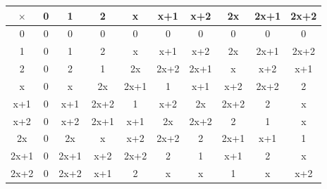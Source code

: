 \documentclass[12pt]{article}
\begin{document}
\begin{flushleft}
    \begin{table}[h]
        \centering
        \renewcommand{\arraystretch}{1.2}
    \begin{tabular}{c|c|c|c|c|c|c|c|c|c}
    $\times$ & 0 & 1 & 2 & x & x+1 & x+2 & 2x & 2x+1 & 2x+2 \\
        \hline
        0 & 0 & 0 & 0 & 0 & 0 & 0 & 0 & 0 & 0 \\
        1 & 0 & 1 & 2 & x & x+1 & x+2 & 2x & 2x+1 & 2x+2 \\
        2 & 0 & 2 & 1 & 2x & 2x+2 & 2x+1 & x & x+2 & x+1 \\
        x & 0 & x & 2x & 2x+1 & 1 & x+1 & x+2 & 2x+2 & 2 \\
        x+1 & 0 & x+1 & 2x+2 & 1 & x+2 & 2x & 2x+2 & 2 & x \\
        x+2 & 0 & x+2 & 2x+1 & x+1 & 2x & 2x+2 & 2 & 1 & x \\
        2x & 0 & 2x & x & x+2 & 2x+2 & 2 & 2x+1 & x+1 & 1 \\
        2x+1 & 0 & 2x+1 & x+2 & 2x+2 & 2 & 1 & x+1 & 2 & x \\
        2x+2 & 0 & 2x+2 & x+1 & 2 & x & x & 1 & x & x+2 \\
    \end{tabular}
    \end{table}
\end{flushleft}


\newpage
\end{document}
